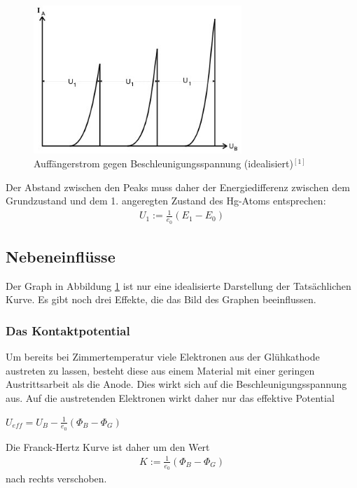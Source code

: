 \begin{figure}[H]
\includegraphics[width=0.7\textwidth]{pics/strom_spannung.jpeg}
\caption{Auffängerstrom gegen Beschleunigungsspannung (idealisiert)$^{[1]}$}
\label{pic_strom_spannung}
\end{figure}
Der Abstand zwischen den Peaks muss daher der Energiedifferenz zwischen dem Grundzustand und dem 1. angeregten Zustand des Hg-Atoms entsprechen:
\begin{align}
U_1:= \frac{1}{e_0}(E_1-E_0)
\end{align}
\subsection{Nebeneinflüsse}
Der Graph in Abbildung \ref{pic_strom_spannung} ist nur eine idealisierte Darstellung der Tatsächlichen Kurve. Es gibt noch drei Effekte, die das Bild des Graphen beeinflussen.
\subsubsection{Das Kontaktpotential}
Um bereits bei Zimmertemperatur viele Elektronen aus der Glühkathode austreten zu lassen, besteht diese aus einem Material mit einer geringen Austrittsarbeit als die Anode. Dies wirkt sich auf die Beschleunigungsspannung aus. Auf die austretenden Elektronen wirkt daher nur das effektive Potential
\begin{formel}[H]
\centering
$U_{eff}= U_B - \frac{1}{e_0}(\Phi_B-\Phi_G)$
\caption*{\small{$\Phi_G$ - Austrittsarbeit Glühdrat, $\Phi_B$ - Austrittsarbeit Beschleunigungselektrode}}
\end{formel}
Die Franck-Hertz Kurve ist daher um den Wert
\begin{align}
K:=\frac{1}{e_0}(\Phi_B-\Phi_G)
\end{align}
nach rechts verschoben.
